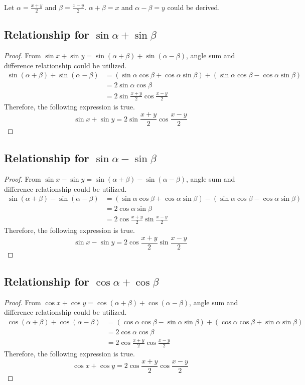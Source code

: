 \documentclass{article}
\begin{document}
\noindent
Let $\alpha=\frac{x+y}{2}$ and $\beta=\frac{x-y}{2}$. $\alpha+\beta=x$ and $\alpha-\beta=y$ could be derived.
\subsection{Relationship for $\sin\alpha+\sin\beta$}
\begin{proof}
    From $\sin x + \sin y=\sin(\alpha+\beta)+\sin(\alpha-\beta)$, angle sum and difference relationship could be utilized.
    \begin{align*}
        \sin(\alpha+\beta)+\sin(\alpha-\beta)&=(\sin\alpha\cos\beta+\cos\alpha\sin\beta)+(\sin\alpha\cos\beta-\cos\alpha\sin\beta) \\
        &=2\sin\alpha\cos\beta \\
        &=2\sin\frac{x+y}{2}\cos\frac{x-y}{2}
    \end{align*}
    Therefore, the following expression is true.
    \[
    \sin x + \sin y=2\sin\frac{x+y}{2}\cos\frac{x-y}{2}
    \]
\end{proof}

\subsection{Relationship for $\sin\alpha-\sin\beta$}
\begin{proof}
    From $\sin x - \sin y=\sin(\alpha+\beta)-\sin(\alpha-\beta)$, angle sum and difference relationship could be utilized.
    \begin{align*}
        \sin(\alpha+\beta)-\sin(\alpha-\beta)&=(\sin\alpha\cos\beta+\cos\alpha\sin\beta)-(\sin\alpha\cos\beta-\cos\alpha\sin\beta) \\
        &=2\cos\alpha\sin\beta \\
        &=2\cos\frac{x+y}{2}\sin\frac{x-y}{2}
    \end{align*}
    Therefore, the following expression is true.
    \[
    \sin x - \sin y=2\cos\frac{x+y}{2}\sin\frac{x-y}{2}
    \]
\end{proof}

\subsection{Relationship for $\cos\alpha+\cos\beta$}
\begin{proof}
    From $\cos x + \cos y=\cos(\alpha+\beta)+\cos(\alpha-\beta)$, angle sum and difference relationship could be utilized.
    \begin{align*}
        \cos(\alpha+\beta)+\cos(\alpha-\beta)&=(\cos\alpha\cos\beta-\sin\alpha\sin\beta)+(\cos\alpha\cos\beta+\sin\alpha\sin\beta) \\
        &=2\cos\alpha\cos\beta \\
        &=2\cos\frac{x+y}{2}\cos\frac{x-y}{2}
    \end{align*}
    Therefore, the following expression is true.
    \[
    \cos x + \cos y=2\cos\frac{x+y}{2}\cos\frac{x-y}{2}
    \]
\end{proof}
\end{document}
